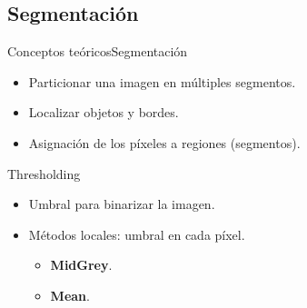 \documentclass[10pt]{beamer}
\begin{document}
\subsection{Segmentación}
\begin{frame}{Conceptos teóricos}{Segmentación}

\begin{itemize}
\item Particionar una imagen en múltiples segmentos.
\item Localizar objetos y bordes.
\item Asignación de los píxeles a regiones (segmentos).\newline
\end{itemize}

\pause

\begin{block}{Thresholding}

\begin{itemize}
\item Umbral para binarizar la imagen.
\item \alert{Métodos locales:} umbral en cada píxel.

  \begin{itemize}
  \item \textbf{MidGrey}.
  \item \textbf{Mean}.
  \end{itemize}

\end{itemize}

\end{block}

\end{frame}
\end{document}
